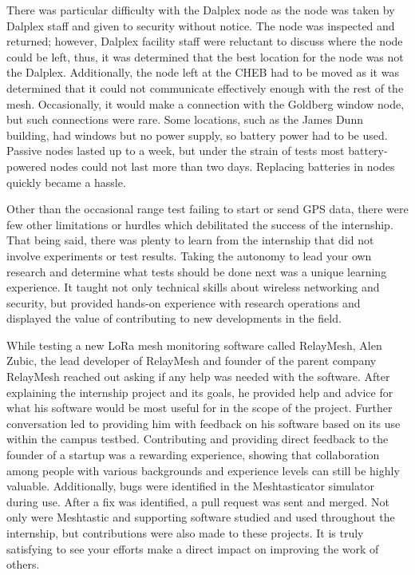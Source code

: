 \documentclass[11pt]{article}
\begin{document}
There was particular difficulty with the Dalplex node as the node was taken by Dalplex staff and given to security without notice. The node was inspected and returned; however, Dalplex facility staff were reluctant to discuss where the node could be left, thus, it was determined that the best location for the node was not the Dalplex. Additionally, the node left at the CHEB had to be moved as it was determined that it could not communicate effectively enough with the rest of the mesh. Occasionally, it would make a connection with the Goldberg window node, but such connections were rare. Some locations, such as the James Dunn building, had windows but no power supply, so battery power had to be used. Passive nodes lasted up to a week, but under the strain of tests most battery-powered nodes could not last more than two days. Replacing batteries in nodes quickly became a hassle. 

Other than the occasional range test failing to start or send GPS data, there were few other limitations or hurdles which debilitated the success of the internship. That being said, there was plenty to learn from the internship that did not involve experiments or test results. Taking the autonomy to lead your own research and determine what tests should be done next was a unique learning experience. It taught not only technical skills about wireless networking and security, but provided hands-on experience with research operations and displayed the value of contributing to new developments in the field. 
	
While testing a new LoRa mesh monitoring software called RelayMesh, Alen Zubic, the lead developer of RelayMesh and founder of the parent company RelayMesh reached out asking if any help was needed with the software. After explaining the internship project and its goals, he provided help and advice for what his software would be most useful for in the scope of the project. Further conversation led to providing him with feedback on his software based on its use within the campus testbed. Contributing and providing direct feedback to the founder of a startup was a rewarding experience, showing that collaboration among people with various backgrounds and experience levels can still be highly valuable. Additionally, bugs were identified in the Meshtasticator simulator during use. After a fix was identified, a pull request was sent and merged. Not only were Meshtastic and supporting software studied and used throughout the internship, but contributions were also made to these projects. It is truly satisfying to see your efforts make a direct impact on improving the work of others.
\end{document}

